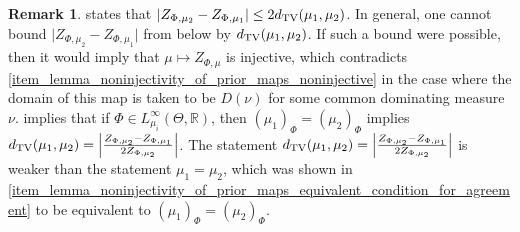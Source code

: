 \documentclass[a4paper]{scrartcl}
\theoremstyle{definition}
\newtheorem{remark}[theorem]{Remark}
\numberwithin{equation}{section}
\newcommand{\R}{\mathbb{R}}
\newcommand{\abs}[1]{\vert #1\vert}
\newcommand{\Abs}[1]{\left\vert#1\right\vert}
\newcommand{\TV}[0]{\textup{TV}}
\begin{document}
\begin{remark}
\label{remark_TV_bounds_noninjectivity_prior_based_maps}
 states that $\abs{Z_{\Phi,\mu_2}-Z_{\Phi,\mu_1}}\leq 2d_{\TV}(\mu_1,\mu_2)$. In general, one cannot bound $\abs{Z_{\Phi,\mu_2}-Z_{\Phi,\mu_1}}$ from below by $d_{\TV}(\mu_1,\mu_2)$. If such a bound were possible, then it would imply that $\mu\mapsto Z_{\Phi,\mu}$ is injective, which contradicts \ref{item_lemma_noninjectivity_of_prior_maps_noninjective} in the case where the domain of this map is taken to be $D(\nu)$ for some common dominating measure $\nu$.
 implies that if $\Phi\in L^\infty_{\mu_i}(\Theta,\R)$, then $(\mu_1)_\Phi=(\mu_2)_\Phi$ implies $d_{\TV}(\mu_1,\mu_2)=\Abs{ \tfrac{Z_{\Phi,\mu_2}-Z_{\Phi,\mu_1}}{2Z_{\Phi,\mu_2}}}$. The statement $d_{\TV}(\mu_1,\mu_2)=\Abs{ \tfrac{Z_{\Phi,\mu_2}-Z_{\Phi,\mu_1}}{2Z_{\Phi,\mu_2}}}$ is weaker than the statement $\mu_1=\mu_2$, which was shown in \ref{item_lemma_noninjectivity_of_prior_maps_equivalent_condition_for_agreement} to be equivalent to $(\mu_1)_\Phi=(\mu_2)_\Phi$.
\end{remark}
\end{document}
